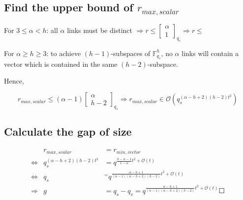 \subsection{Find the upper bound of $r_{max,scalar}$}

\noindent{}

For $3\leq\alpha<h$: all $\alpha$ links must be distinct $\Rightarrow r\leq\left[\begin{array}{c}
\alpha\\
1
\end{array}\right]_{q_{s}}\Rightarrow r\leq$

For $\alpha\geq h\geq3$: to achieve $(h-1)$-subspaces of $\ensuremath{\mathbb{F}}_{q_{s}}^{h}$,
no $\alpha$ links will contain a vector which is contained in the
same $(h-2)$-subspace.

Hence,

\[
r_{max,scalar}\leq\left(\alpha-1\right)\left[\begin{array}{c}
\alpha\\
h-2
\end{array}\right]_{q_{s}}\Rightarrow r_{max,scalar}\in\mathcal{O}\left(q_{s}^{\left(\alpha-h+2\right)\left(h-2\right)t^{2}}\right)
\]


\subsection{Calculate the gap of size}

\begin{eqnarray*}
 & r_{max,scalar} & =r_{min,vector}\\
\Leftrightarrow & q_{s}^{\left(\alpha-h+2\right)\left(h-2\right)t^{2}} & =q^{\frac{h-\alpha-1}{1-\alpha}t^{2}+\mathcal{O}(t)}\\
\Leftrightarrow & q_{s} & ^{=}q^{\frac{\alpha-h+1}{\left(\alpha-1\right)\left(\alpha-h+2\right)\left(h-2\right)}t^{2}+\mathcal{O}(t)}\\
\Rightarrow & g & =q_{s}-q_{v}=q^{\frac{\alpha-h+1}{\left(\alpha-1\right)\left(\alpha-h+2\right)\left(h-2\right)}t^{2}+\mathcal{O}(t)}\Square
\end{eqnarray*}

\clearpage